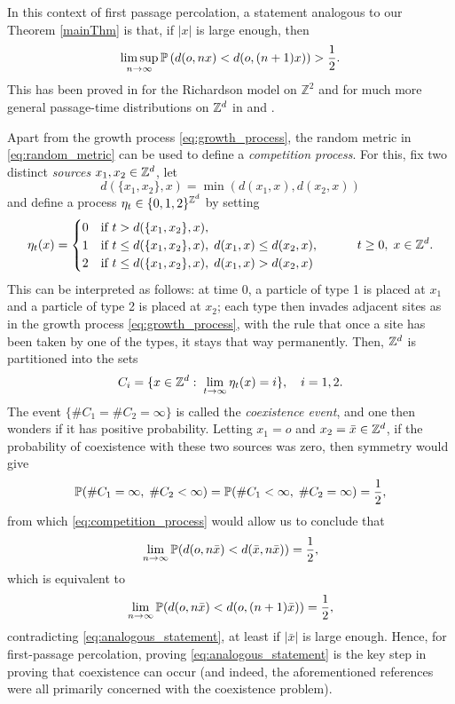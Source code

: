 In this context of first passage percolation, a statement analogous to our Theorem \ref{mainThm} is that, if $|x|$ is large enough, then
\begin{equation}
\label{eq:analogous_statement}
\limsup_{n\to\infty} \P\left(d(o,nx) < d(o,(n+1)x) \right) > \frac12.
\end{equation}
This has been proved in \cite{haggstrom1998first} for the Richardson model on $\mathbb{Z}^2$ and for much more general passage-time distributions on $\Zd$ in \cite{GaretMarch05} and \cite{Hoffm05}.

Apart from the growth process \eqref{eq:growth_process}, the random metric in \eqref{eq:random_metric} can be used to define a \textit{competition process}. For this, fix two distinct \textit{sources} $x_1, x_2 \in \Zd$, let $$d(\{x_1,x_2\},x) = \min(d(x_1,x),d(x_2,x))$$ and define a process $\eta_t \in \{0,1,2\}^\Zd$ by setting
\begin{equation}
\label{eq:competition_process}
\eta_t(x) = \begin{cases}0&\text{if } t > d(\{x_1,x_2\},x),\\1&\text{if } t \leq d(\{x_1,x_2\},x),\; d(x_1,x) \le d(x_2,x),\\
2&\text{if }   t \leq d(\{x_1,x_2\},x),\; d(x_1,x) > d(x_2,x) \end{cases} \quad\qquad t \geq 0,\; x \in \Zd.
\end{equation}
This can be interpreted as follows: at time 0, a particle of type 1 is placed at $x_1$ and a particle of type 2 is placed at $x_2$; each type then invades adjacent sites as in the growth process \eqref{eq:growth_process}, with the rule that once a site has been taken by one of the types, it stays that way permanently. Then, $\Zd$ is partitioned into the sets
$$C_i = \{x\in\Zd:\;\lim_{t\to\infty}\eta_t(x) = i\},\quad i = 1,2.$$
The event $\{\#C_1=\#C_2 = \infty\}$ is called the \textit{coexistence event}, and one then wonders if it has positive probability. Letting $x_1= o$ and $x_2 = \bar{x} \in \Zd$, if the probability of coexistence with these two sources was zero, then symmetry would give
$$\P( \#C_1 = \infty,\;\#C_2 < \infty) = \P(\#C_1 < \infty,\;\#C_2 = \infty) = \frac12,$$
from which \eqref{eq:competition_process}  would allow us to conclude that
\begin{equation} \label{eq:first_impli}\lim_{n \to \infty} \P(d(o,n\bar{x}) < d(\bar{x},n\bar{x})) = \frac12,\end{equation}
which is equivalent to
\begin{equation} \label{eq:second_impli}\lim_{n \to \infty} \P(d(o,n\bar{x}) < d(o,(n+1)\bar{x})) = \frac12,\end{equation}
contradicting \eqref{eq:analogous_statement}, at least if $|\bar{x}|$ is large enough. Hence, for first-passage percolation, proving \eqref{eq:analogous_statement} is the key step in proving that coexistence can occur (and indeed, the aforementioned references \cite{haggstrom1998first, GaretMarch05, Hoffm05} were all primarily concerned with the coexistence problem).

